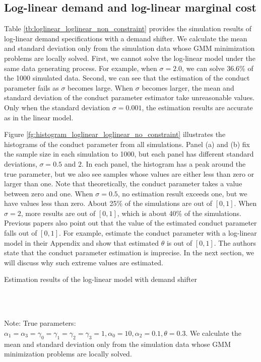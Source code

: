 \documentclass[11pt, a4paper]{article}
\begin{document}
\subsection{Log-linear demand and log-linear marginal cost}\label{subsec:log_linear_demand_and_log_linear_marginal_cost}
Table \ref{tb:loglinear_loglinear_non_constraint} provides the simulation results of log-linear demand specifications with a demand shifter.
We calculate the mean and standard deviation only from the simulation data whose GMM minimization problems are locally solved. 
First, we cannot solve the log-linear model under the same data generating process. For example, when $\sigma=2.0$, we can solve 36.6\% of the 1000 simulated data.
Second, we can see that the estimation of the conduct parameter fails as $\sigma$ becomes large. 
When $\sigma$ becomes larger, the mean and standard deviation of the conduct parameter estimator take unreasonable values.
Only when the standard deviation $\sigma = 0.001$, the estimation results are accurate as in the linear model. 

Figure \ref{fg:histogram_loglinear_loglinear_no_constraint} illustrates the histograms of the conduct parameter from all simulations.
Panel (a) and (b) fix the sample size in each simulation to 1000, but each panel has different standard deviations, $\sigma = 0.5$ and $2$.
In each panel, the histogram has a peak around the true parameter, but we also see samples whose values are either less than zero or larger than one.
Note that theoretically, the conduct parameter takes a value between zero and one.
When $\sigma = 0.5$, no estimation result exceeds one, but we have values less than zero.
About 25\% of the simulations are out of $[0,1]$.
When $\sigma = 2$, more results are out of $[0,1]$, which is about 40\% of the simulations. 
Previous papers also point out that the value of the estimated conduct parameter falls out of $[0,1]$.
For example, \citet{okazaki2022excess} estimate the conduct parameter with a log-linear model in their Appendix and show that estimated $\theta$ is out of $[0,1]$.
The authors state that the conduct parameter estimation is imprecise.
In the next section, we will discuss why such extreme values are estimated.


\begin{table}[!htbp]
      \begin{center}
          \caption{Estimation results of the log-linear model with demand shifter}
          \label{tb:loglinear_loglinear_non_constraint} 
          \subfloat[$\sigma=0.001$]{}\\
          \subfloat[$\sigma=0.5$]{}\\
      \end{center}\footnotesize
      Note: True parameters: $\alpha_1 = \alpha_3 = \gamma_0 = \gamma_1 = \gamma_2  = \gamma_3 = 1, \alpha_0 = 10, \alpha_2 = 0.1,  \theta = 0.3.$ We calculate the mean and standard deviation only from the simulation data whose GMM minimization problems are locally solved.  
\end{table} 
\end{document}

